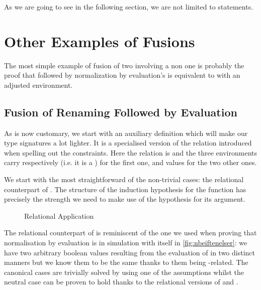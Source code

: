 As we are going to see in the following section, we are not limited
to  statements.

\section{Other Examples of Fusions}

The most simple example of fusion of two  involving a non 
one is probably the proof that  followed by normalization by evaluation's
 is equivalent to  with an adjusted environment.

\subsection{Fusion of Renaming Followed by Evaluation}
\label{sec:fusionrennbe}

As is now customary, we start with an auxiliary definition which will make our
type signatures a lot lighter. It is a specialised version of the relation 
introduced when spelling out the  constraints. Here the relation is 
and the three environments carry respectively  (i.e. it is a ) for
the first one, and  values for the two other ones.


We start with the most straightforward of the non-trivial cases: the relational
counterpart of . The  structure of the induction hypothesis
for the function has precisely the strength we need to make use of the hypothesis
for its argument.

\begin{figure}[h]
\caption{Relational Application}
\end{figure}

The relational counterpart of  is reminiscent of the one we used when
proving that normalisation by evaluation is in simulation with itself in
\cref{fig:nbeiftenelser}: we have two arbitrary boolean values resulting from the
evaluation of  in two distinct manners but we know them to be the same thanks
to them being -related. The canonical cases are trivially solved by
using one of the assumptions whilst the neutral case can be proven to hold thanks
to the relational versions of  and .

